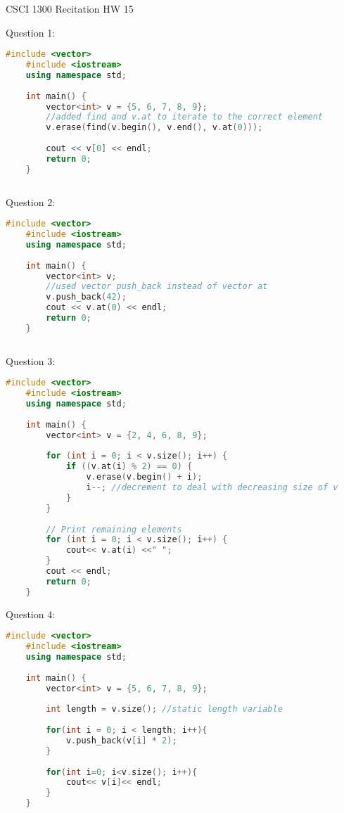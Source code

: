 \documentclass{article}
\begin{document}
CSCI 1300 Recitation HW 15

\vspace{1cm}

Question 1:

\begin{lstlisting}[language=C++]
    #include <vector>
    #include <iostream>
    using namespace std;
    
    int main() {
        vector<int> v = {5, 6, 7, 8, 9};
        //added find and v.at to iterate to the correct element
        v.erase(find(v.begin(), v.end(), v.at(0)));
        
        cout << v[0] << endl;
        return 0;
    }
    
\end{lstlisting}

\vspace{1cm}

Question 2:

\begin{lstlisting}[language=C++]
    #include <vector>
    #include <iostream>
    using namespace std;
    
    int main() {
        vector<int> v;
        //used vector push_back instead of vector at
        v.push_back(42);
        cout << v.at(0) << endl;
        return 0;
    }
    
\end{lstlisting}

\vspace{1cm}

Question 3:

\begin{lstlisting}[language=C++]
    #include <vector>
    #include <iostream>
    using namespace std;
    
    int main() {
        vector<int> v = {2, 4, 6, 8, 9};
    
        for (int i = 0; i < v.size(); i++) {
            if ((v.at(i) % 2) == 0) {
                v.erase(v.begin() + i);
                i--; //decrement to deal with decreasing size of v
            }
        }
    
        // Print remaining elements
        for (int i = 0; i < v.size(); i++) {
            cout<< v.at(i) <<" ";
        }
        cout << endl;
        return 0;
    }    
\end{lstlisting}

\vspace{1cm}

Question 4:

\begin{lstlisting}[language=C++]
    #include <vector>
    #include <iostream>
    using namespace std;
    
    int main() {
        vector<int> v = {5, 6, 7, 8, 9};
        
        int length = v.size(); //static length variable
    
        for(int i = 0; i < length; i++){
            v.push_back(v[i] * 2);
        }
        
        for(int i=0; i<v.size(); i++){
            cout<< v[i]<< endl;
        }
    }
    
\end{lstlisting}
\end{document}
